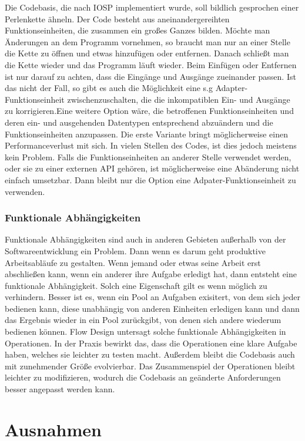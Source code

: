 Die Codebasis, die nach IOSP implementiert wurde, soll bildlich gesprochen einer
Perlenkette ähneln. Der Code besteht aus aneinandergereihten Funktionseinheiten,
die zusammen ein großes Ganzes bilden. Möchte man Änderungen an dem Programm
vornehmen, so braucht man nur an einer Stelle die Kette zu öffnen und etwas
hinzufügen oder entfernen. Danach schließt man die Kette wieder und das Programm
läuft wieder. Beim Einfügen oder Entfernen ist nur darauf zu achten, dass die
Eingänge und Ausgänge zueinander passen. Ist das nicht der Fall, so gibt es auch
die Möglichkeit eine s.g Adapter-Funktionseinheit zwischenzuschalten, die die inkompatiblen
Ein- und Ausgänge zu korrigieren.Eine weitere Option wäre, die betroffenen
Funktionseinheiten und deren
ein- und ausgehenden Datentypen entsprechend abzuändern und die
Funktionseinheiten anzupassen.
Die erste Variante bringt möglicherweise einen Performanceverlust mit sich.
In vielen Stellen des Codes, ist dies jedoch meistens kein Problem.
Falls die Funktionseinheiten an anderer Stelle verwendet werden, oder sie zu
einer externen API gehören, ist möglicherweise eine Abänderung nicht
einfach umsetzbar. Dann bleibt nur die Option eine Adpater-Funktionseinheit zu verwenden.

\subsubsection{Funktionale Abhängigkeiten}

Funktionale Abhängigkeiten sind auch in anderen Gebieten außerhalb von der
Softwareentwicklung ein Problem. Dann wenn es darum geht produktive
Arbeitsabläufe zu gestalten.
Wenn jemand oder etwas seine Arbeit erst abschließen kann, wenn ein anderer
ihre Aufgabe erledigt hat, dann entsteht eine funktionale Abhängigkeit.
Solch eine Eigenschaft gilt es wenn möglich zu verhindern.
Besser ist es, wenn ein Pool an Aufgaben exisitert, von dem sich jeder bedienen kann,
diese unabhängig von anderen Einheiten erledigen kann und dann das Ergebnis wieder
in ein Pool zurückgibt, von denen sich andere wiederum bedienen können.
Flow Design untersagt solche funktionale Abhängigkeiten in Operationen.
In der Praxis bewirkt das, dass die Operationen eine klare Aufgabe haben, welches
sie leichter zu testen macht.
Außerdem bleibt die Codebasis auch mit zunehmender Größe evolvierbar. Das
Zusammenspiel der Operationen bleibt leichter zu modifizieren, wodurch die
Codebasis an geänderte Anforderungen besser angepasst werden kann.

\section{Ausnahmen}

